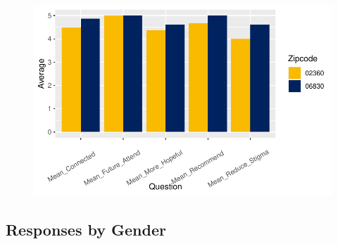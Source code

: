 \documentclass[
  letterpaper,
  DIV=11,
  numbers=noendperiod]{scrartcl}
\begin{document}
\begin{figure}[H]

{\centering \includegraphics{ytp_post_event_survey_files/figure-pdf/unnamed-chunk-15-1.pdf}

}

\end{figure}

\hypertarget{responses-by-gender}{%
\subsection{Responses by Gender}\label{responses-by-gender}}
\end{document}
